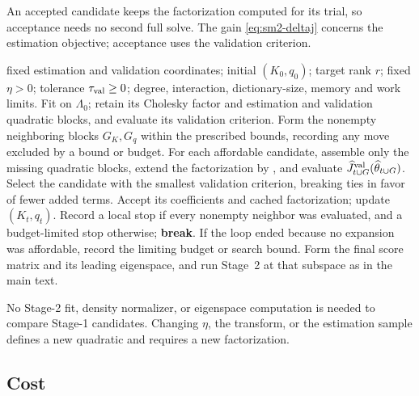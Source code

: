 \documentclass[supplement,review,hidelinks,onefignum,onetabnum]{siamart251216}
\begin{document}
An accepted candidate keeps the factorization computed for its trial, so acceptance needs no second full solve. The gain \eqref{eq:sm2-deltaj} concerns the estimation objective; acceptance uses the validation criterion.

\begin{algorithm}[t]
\caption{Proposed greedy Stage-1 dictionary search.}
\label{alg:adaptive-cas}
\small
\begin{algorithmic}[1]
\Require fixed estimation and validation coordinates; initial $(K_0,q_0)$; target rank $r$; fixed $\eta>0$; tolerance $\tau_{\rm val}\ge0$; degree, interaction, dictionary-size, memory and work limits.
\State Fit on $\Lambda_0$; retain its Cholesky factor and estimation and validation quadratic blocks, and evaluate its validation criterion.
  \State Form the nonempty neighboring blocks $G_K, G_q$ within the prescribed bounds, recording any move excluded by a bound or budget.
  \State For each affordable candidate, assemble only the missing quadratic blocks, extend the factorization by , and evaluate $\widehat J^{\rm val}_{t\cup G}(\widehat\theta_{t\cup G})$.
  \State Select the candidate with the smallest validation criterion, breaking ties in favor of fewer added terms.
    \State Accept its coefficients and cached factorization; update $(K_t,q_t)$.
  \Else
    \State Record a local stop if every nonempty neighbor was evaluated, and a budget-limited stop otherwise; \textbf{break}.
  \EndIf
\EndWhile
\State If the loop ended because no expansion was affordable, record the limiting budget or search bound.
\State Form the final score matrix and its leading eigenspace, and run Stage~2 at that subspace as in the main text.
\end{algorithmic}
\end{algorithm}

No Stage-2 fit, density normalizer, or eigenspace computation is needed to compare Stage-1 candidates. Changing $\eta$, the transform, or the estimation sample defines a new quadratic and requires a new factorization.

\subsection{Cost}
\label{app:adaptive-cost}
\end{document}
